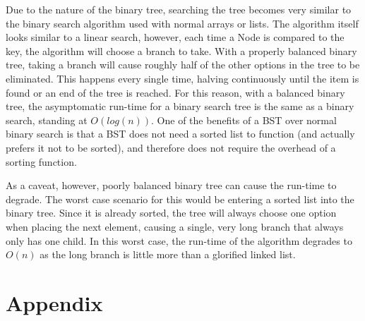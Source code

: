 \documentclass[letterpaper, 10pt,DIV=13]{scrartcl}
\numberwithin{equation}{section} %
\numberwithin{figure}{section} %
\numberwithin{table}{section} %
\begin{document}
Due to the nature of the binary tree, searching the tree becomes very similar to the binary search algorithm used with normal arrays or lists. The algorithm itself looks similar to a linear search, however, each time a Node is compared to the key, the algorithm will choose a branch to take. With a properly balanced binary tree, taking a branch will cause roughly half of the other options in the tree to be eliminated. This happens every single time, halving continuously until the item is found or an end of the tree is reached. For this reason, with a balanced binary tree, the asymptomatic run-time for a binary search tree is the same as a binary search, standing at $O(log(n))$. One of the benefits of a BST over normal binary search is that a BST does not need a sorted list to function (and actually prefers it not to be sorted), and therefore does not require the overhead of a sorting function.

As a caveat, however, poorly balanced binary tree can cause the run-time to degrade. The worst case scenario for this would be entering a sorted list into the binary tree. Since it is already sorted, the tree will always choose one option when placing the next element, causing a single, very long branch that always only has one child. In this worst case, the run-time of the algorithm degrades to $O(n)$ as the long branch is little more than a glorified linked list.
\pagebreak
\section{Appendix}
\end{document}
